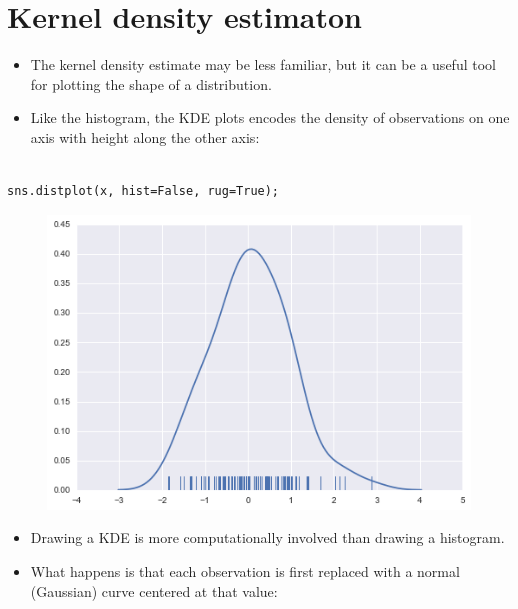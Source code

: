 \documentclass{beamer}
\begin{document}
\section{Kernel density estimaton}
\begin{frame}[fragile]
\begin{itemize}
\item The kernel density estimate may be less familiar, but it can be a useful tool for plotting the shape of a distribution. 
\item Like the histogram, the KDE plots encodes the density of observations on one axis with height along the other axis:
\end{itemize}	



\end{frame}
\begin{frame}[fragile]
	\large
\begin{verbatim}

sns.distplot(x, hist=False, rug=True);
\end{verbatim}
\begin{figure}
	\centering
	\includegraphics[width=0.7\linewidth]{images/distributions_14_0}
\end{figure}
\end{frame}
\begin{frame}[fragile]
	\begin{itemize}
\item Drawing a KDE is more computationally involved than drawing a histogram.
\item What happens is that each observation is first replaced with a normal (Gaussian) curve centered at that value:
	\end{itemize}


\end{frame}
\end{document}
